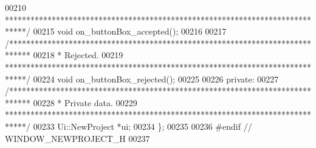 \begin{DoxyCode}
00210 \textcolor{comment}{  *****************************************************************************/}
00215   \textcolor{keywordtype}{void} on\_buttonBox\_accepted();
00216 
00217   \textcolor{comment}{/*****************************************************************************}
00218 \textcolor{comment}{  * Rejected.}
00219 \textcolor{comment}{  *****************************************************************************/}
00224   \textcolor{keywordtype}{void} on\_buttonBox\_rejected();
00225 
00226 \textcolor{keyword}{private}:
00227   \textcolor{comment}{/*****************************************************************************}
00228 \textcolor{comment}{  * Private data.}
00229 \textcolor{comment}{  *****************************************************************************/}
00233   Ui::NewProject *ui;
00234 \};
00235 
00236 \textcolor{preprocessor}{#endif  // WINDOW\_NEWPROJECT\_H}
00237 
\end{DoxyCode}
